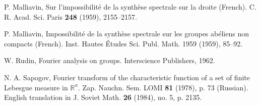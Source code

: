 \documentclass[reqno,a4paper,12pt]{amsart}
\numberwithin{equation}{section}
\numberwithin{figure}{section}
\newcommand\R{\mathbb{R}}
\newcommand\1{\mathds{1}}
\theoremstyle{plain}
\theoremstyle{definition}
\begin{document}
\begin{thebibliography}{9999999}
P. Malliavin, 
Sur l'impossibilit\'e de la synth\`ese spectrale sur la droite (French).
C. R. Acad. Sci. Paris \textbf{248} (1959), 2155--2157.

P. Malliavin, 
Impossibilit\'e de la synth\`ese spectrale sur les 
groupes ab\'eliens non compacts (French).
Inst. Hautes \'Etudes Sci. Publ. Math. 1959 (1959), 85--92.

W. Rudin, 
Fourier analysis on groups. 
Interscience Publishers, 1962.

N. A. Sapogov, Fourier transform of the characteristic function of a set of finite Lebesgue measure in $\R^n$.
Zap. Nauchn. Sem. LOMI \textbf{81} (1978), p. 73 (Russian).
English translation in J. Soviet Math. \textbf{26} (1984), no. 5, p. 2135.

\end{thebibliography}
\end{document}
